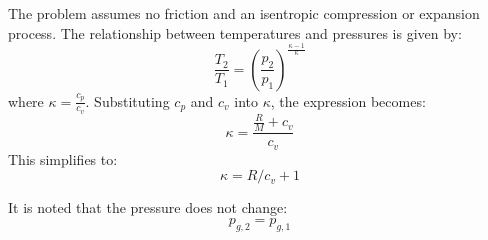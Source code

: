 The problem assumes no friction and an isentropic compression or expansion process. The relationship between temperatures and pressures is given by:  
\[
\frac{T_2}{T_1} = \left( \frac{p_2}{p_1} \right)^{\frac{\kappa - 1}{\kappa}}
\]  
where \( \kappa = \frac{c_p}{c_v} \). Substituting \( c_p \) and \( c_v \) into \( \kappa \), the expression becomes:  
\[
\kappa = \frac{\frac{R}{M} + c_v}{c_v}
\]  
This simplifies to:  
\[
\kappa = R/c_v + 1
\]  

It is noted that the pressure does not change:  
\[
p_{g,2} = p_{g,1}
\]
